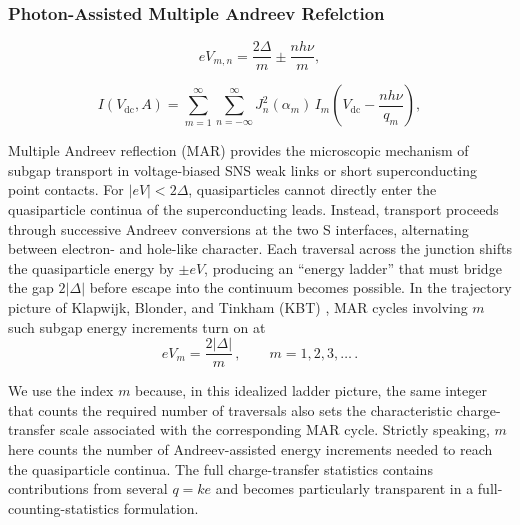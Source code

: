         \subsubsection*{Photon-Assisted Multiple Andreev Refelction}

            \begin{equation}
                eV_{m,n}
                = \frac{2\Delta}{m}
                    \pm \frac{n h\nu}{m},
            \end{equation}

        \begin{equation}
                I(V_{\mathrm{dc}},A)
                = \sum_{m=1}^{\infty}
                    \sum_{n=-\infty}^{\infty}
                        J_n^2(\alpha_m)\,
                        I_m\!\left(
                            V_{\mathrm{dc}}
                            - \frac{n h\nu}{q_m}
                        \right),
                \label{eq:meso:pamar-unified}
            \end{equation}



        Multiple Andreev reflection (MAR) provides the microscopic mechanism of subgap transport in voltage-biased SNS weak links or short superconducting point contacts. For $|eV|<2\Delta$, quasiparticles cannot directly enter the quasiparticle continua of the superconducting leads. Instead, transport proceeds through successive Andreev conversions at the two S interfaces, alternating between electron- and hole-like character. Each traversal across the junction shifts the quasiparticle energy by $\pm eV$, producing an ``energy ladder'' that must bridge the gap $2|\Delta|$ before escape into the continuum becomes possible. In the trajectory picture of Klapwijk, Blonder, and Tinkham (KBT) \cite{klapwijk_explanation_1982}, MAR cycles involving $m$ such subgap energy increments turn on at
        \begin{equation}
            eV_m=\frac{2|\Delta|}{m}\,,\qquad m=1,2,3,\dots\,.
            \label{eq:meso:mar-sgs}
        \end{equation}

        We use the index $m$ because, in this idealized ladder picture, the same integer that counts the required number of traversals also sets the characteristic charge-transfer scale associated with the corresponding MAR cycle. Strictly speaking, $m$ here counts the number of Andreev-assisted energy increments needed to reach the quasiparticle continua. The full charge-transfer statistics contains contributions from several $q=ke$ and becomes particularly transparent in a full-counting-statistics formulation.

